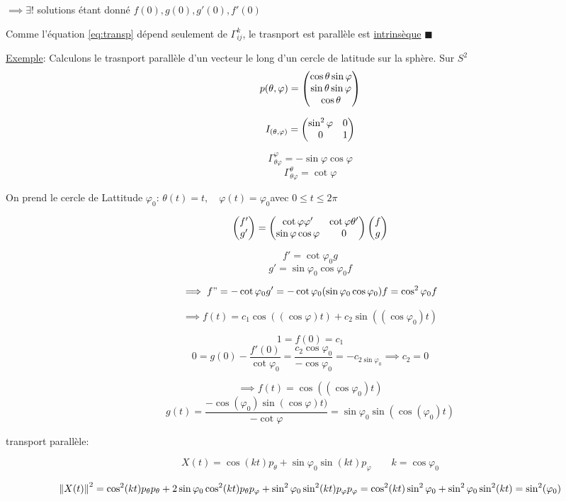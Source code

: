 $\implies \exists!$ solutions étant donné $f(0),g(0), g'(0), f'(0)$  

Comme l'équation \eqref{eq:transp} dépend seulement de $\Gamma_{ij}^k$, le trasnport est parallèle est \underline{intrinsèque}   
$\blacksquare$

\underline{Exemple}: Calculons le trasnport parallèle d'un vecteur le long d'un cercle de latitude sur la sphère. Sur $S^2$ $$p(\theta, \varphi) = \begin{pmatrix} \cos\theta\sin\varphi\\\sin\theta\sin\varphi\\\cos\theta \end{pmatrix}$$   

$$I_{(\theta,\varphi)} = \begin{pmatrix} \sin^2\varphi & 0 \\ 0 &1 \end{pmatrix}$$ 

$$\Gamma_{\theta\varphi}^\varphi = -\sin\varphi\cos\varphi$$ 
$$\Gamma_{\theta\varphi}^\theta = \cot\varphi$$

On prend le cercle de Lattitude $\varphi_{0}$: $\theta(t) = t,\quad \varphi(t)=\varphi_{0} $avec $0\leq t \leq 2\pi$    

$$\begin{pmatrix} f'\\g' \end{pmatrix} = \begin{pmatrix} \cot\varphi\varphi'& \cot\varphi\theta'\\\sin\varphi\cos\varphi&0 \end{pmatrix}\begin{pmatrix} f\\g \end{pmatrix}$$ 

$$f'= \cot\varphi_{0} g$$ 
$$g' = \sin\varphi_{0}\cos\varphi_{0} f $$ 


$$\implies f" = -\cot\varphi_{0} g' = -\cot\varphi_{0} (\sin\varphi_0\cos\varphi_0) f = \cos^2\varphi_{0} f$$ 

$$\implies f(t) = c_{1} \cos((\cos\varphi)t) + c_{2} \sin((\cos\varphi_0)t)$$ 

$$1 = f(0) =c_1$$ 
$$0 = g(0) - \frac{f'(0)}{\cot\varphi_0} = \frac{c_{2}\cos\varphi_{0}}{-\cos\varphi_{0}} = -c_{2\sin\varphi_0} \implies c_{2} = 0$$ 

$$\implies f(t) = \cos((\cos\varphi_{0} )t)$$
$$g(t) = \frac{-\cos(\varphi_0)\sin(\cos\varphi)t)}{-\cot\varphi} = \sin\varphi_{0} \sin(\cos(\varphi_0)t)$$ 

transport parallèle:

$$X(t)=\cos(kt)p_{\theta} + \sin\varphi_0\sin(kt)p_{\varphi} \qquad k = \cos\varphi_{0} $$ 

$$\norm{X(t)}^2 =\cos^2(kt)p_{\theta} p_{\theta} + 2\sin\varphi_{0} \cos^2(kt) p_{\theta} p_{\varphi} + \sin^2 \varphi_{0}\sin^2(kt)p_{\varphi} p_{\varphi} =  \cos^2(kt)\sin^2\varphi_{0} + \sin^2\varphi_{0}\sin^2(kt) = \sin^2(\varphi_0)$$

